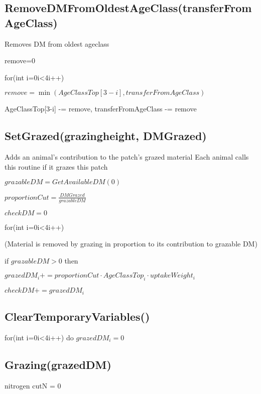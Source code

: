 \documentclass[%
]{scrartcl}
\begin{document}



\subsection{RemoveDMFromOldestAgeClass(transferFromAgeClass)}
Removes DM from oldest ageclass

    remove=0

   for(int i=0i<4i++)
   
   \quad $remove=\min(AgeClassTop[3-i],transferFromAgeClass)$

    \quad  AgeClassTop[3-i] -= remove, 
    transferFromAgeClass -= remove
   




\subsection{SetGrazed(grazingheight, DMGrazed)}
Adds an animal's contribution to the patch's grazed material
Each animal calls this routine if it grazes this patch

   $grazableDM = GetAvailableDM(0)$

   $proportionCut=\tfrac{DMGrazed}{grazableDM}$

   $checkDM=0$

   for(int i=0i<4i++)
   
      \quad (Material is removed by grazing in proportion to its contribution to grazable DM)

       \quad if $grazableDM>0$ then
      
      	 \quad \quad $grazedDM_i+=proportionCut  \cdot  AgeClassTop_i  \cdot  uptakeWeight_i$

          \quad \quad $checkDM+=grazedDM_i$

   


   

\subsection{ClearTemporaryVariables()}
   for(int i=0i<4i++) do $grazedDM_i=0$




\subsection{Grazing(grazedDM)}  
	   nitrogen cutN = 0
\end{document}
